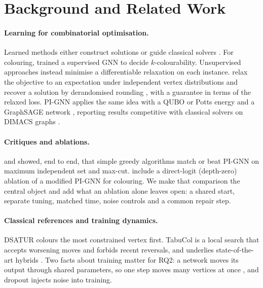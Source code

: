 \documentclass[11pt]{article}
\begin{document}
\section{Background and Related Work}

\paragraph{Learning for combinatorial optimisation.} Learned methods either
construct solutions or guide classical solvers \cite{bengio2021ml4co}. For
colouring, \citet{lemos2019gcp} trained a supervised GNN to decide
$k$-colourability. Unsupervised approaches instead minimise a differentiable
relaxation on each instance. \citet{karalias2020erdos} relax the objective to
an expectation under independent vertex distributions and recover a solution by
derandomised rounding \cite{raghavan1988derandomization}, with a guarantee in
terms of the relaxed loss. PI-GNN \cite{schuetz2022combopt,schuetz2022colouring}
applies the same idea with a QUBO or Potts energy \cite{wu1982potts} and a
GraphSAGE network \cite{hamilton2017sage}, reporting results competitive
with classical solvers on DIMACS graphs \cite{johnson1996dimacs}.

\paragraph{Critiques and ablations.} \citet{angelini2023cautionary} and
\citet{boettcher2023inability} showed, end to end, that simple greedy
algorithms match or beat PI-GNN on maximum independent set and max-cut.
\citet{vanderbush2026nar} include a direct-logit (depth-zero)
ablation of a modified PI-GNN for colouring. We make that comparison the
central object and add what an ablation alone leaves open: a shared start,
separate tuning, matched time, noise controls and a common repair step.

\paragraph{Classical references and training dynamics.} DSATUR
\cite{brelaz1979} colours the most constrained vertex first. TabuCol
\cite{hertz1987tabu} is a local search that accepts worsening moves and
forbids recent reversals, and underlies state-of-the-art hybrids
\cite{galinier1999hybrid}. Two facts about training matter for RQ2: a network moves its output through shared
parameters, so one step moves many vertices at once \cite{jacot2018ntk}, and
dropout \cite{srivastava2014dropout} injects noise into training.
\end{document}
